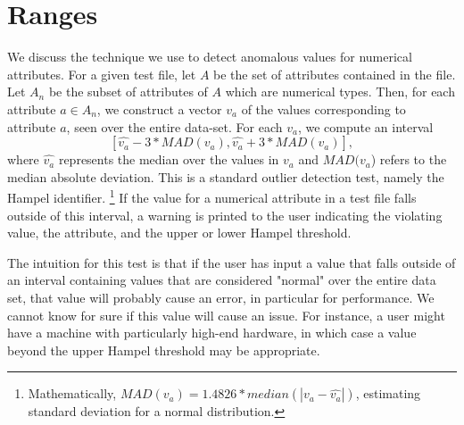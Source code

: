 
\section{Ranges}
\label{sec-learn-ranges}

We discuss the technique we use to detect anomalous values for numerical attributes. For a given 
test file, let $A$ be the set of attributes contained in the file. Let $A_n$ be the subset of attributes 
of $A$ which are numerical types. Then, for each attribute $a \in A_n$, we construct a vector $v_a$ of the 
values corresponding to attribute $a$, seen over the entire data-set. For each $v_a$, we compute 
an interval  $$[\hat{v_a} - 3*MAD(v_a), \hat{v_a} + 3*MAD(v_a)],$$ 
where $\hat{v_a}$ represents the median over the values in $v_a$ and $MAD(v_a$) refers to the 
median absolute deviation. This is a standard outlier detection test, namely the Hampel identifier. 
\footnote{Mathematically, $MAD(v_a) = 1.4826* median(|v_a - \hat{v_a}|)$, estimating standard deviation 
for a normal distribution.} If the value for a numerical attribute in a test file 
falls outside of this interval, a warning is printed to the user indicating the violating value, 
the attribute, and the upper or lower Hampel threshold. 

The intuition for this test is that if the user has input a value that falls outside of an 
interval containing values that are considered "normal" over the entire data set, 
that value will probably cause an error, in particular for performance. We cannot know for sure
if this value will cause an issue. For instance, a user might have a machine with 
particularly high-end hardware, in which case a value beyond the upper Hampel threshold may be appropriate. 
